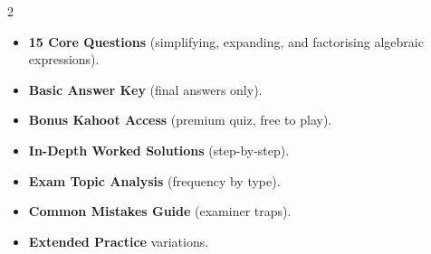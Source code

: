 \documentclass[11pt,a4paper]{article}
\newcommand{\FullReleaseDate}{April 30, 2026}
\begin{document}
\vspace{8pt}

\begin{multicols}{2}
  \begin{tcolorbox}[card, title=\sffamily\bfseries\textcolor{white}{\faHandPointDown\ TODAY (Simplified Version)}, colbacktitle=mainblue, boxed title style={sharp corners, boxrule=0pt}]
    \begin{itemize}[leftmargin=1.2em, itemsep=2pt]
      \item \small \textbf{15 Core Questions} (simplifying, expanding, and factorising algebraic expressions).
      \item \small \textbf{Basic Answer Key} (final answers only).
      \item \small \textbf{Bonus Kahoot Access} (premium quiz, free to play).
    \end{itemize}
  \end{tcolorbox}

  \columnbreak

  \begin{tcolorbox}[card, title=\sffamily\bfseries\textcolor{white}{\faRocket\ ON \FullReleaseDate\ (Full Upgrade)}, colbacktitle=mainblue, boxed title style={sharp corners, boxrule=0pt}]
    \begin{itemize}[leftmargin=1.2em, itemsep=2pt]
      \item \small \textbf{In-Depth Worked Solutions} (step-by-step).
      \item \small \textbf{Exam Topic Analysis} (frequency by type).
      \item \small \textbf{Common Mistakes Guide} (examiner traps).
      \item \small \textbf{Extended Practice} variations.
    \end{itemize}
  \end{tcolorbox}
\end{multicols}
\end{document}
